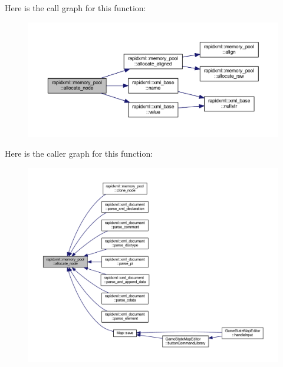 Here is the call graph for this function\+:\nopagebreak
\begin{figure}[H]
\begin{center}
\leavevmode
\includegraphics[width=350pt]{classrapidxml_1_1memory__pool_a4118581c29ee9a2f6b55ebf7dac185f8_cgraph}
\end{center}
\end{figure}




Here is the caller graph for this function\+:
\nopagebreak
\begin{figure}[H]
\begin{center}
\leavevmode
\includegraphics[width=350pt]{classrapidxml_1_1memory__pool_a4118581c29ee9a2f6b55ebf7dac185f8_icgraph}
\end{center}
\end{figure}


